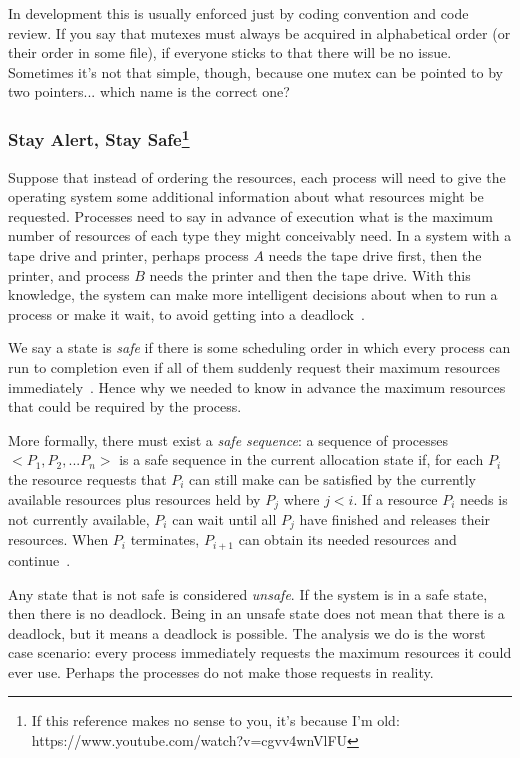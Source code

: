 In development this is usually enforced just by coding convention and code review. If you say that mutexes must always be acquired in alphabetical order (or their order in some file), if everyone sticks to that there will be no issue. Sometimes it's not that simple, though, because one mutex can be pointed to by two pointers... which name is the correct one?

\subsubsection*{Stay Alert, Stay Safe\footnote{If this reference makes no sense to you, it's because I'm old: https://www.youtube.com/watch?v=cgvv4wnVlFU}}

Suppose that instead of ordering the resources, each process will need to give the operating system some additional information about what resources might be requested. Processes need to say in advance of execution what is the maximum number of resources of each type they might conceivably need. In a system with a tape drive and printer, perhaps process $A$ needs the tape drive first, then the printer, and process $B$ needs the printer and then the tape drive. With this knowledge, the system can make more intelligent decisions about when to run a process or make it wait, to avoid getting into a deadlock~\cite{osc}.

We say a state is \textit{safe} if there is some scheduling order in which every process can run to completion even if all of them suddenly request their maximum resources immediately~\cite{mos}. Hence why we needed to know in advance the maximum resources that could be required by the process.

More formally, there must exist a \textit{safe sequence}: a sequence of processes $<P_{1}, P_{2}, ... P_{n}>$ is a safe sequence in the current allocation state if, for each $P_{i}$ the resource requests that $P_{i}$ can still make can be satisfied by the currently available resources plus resources held by $P_{j}$ where $j < i$. If a resource $P_{i}$ needs is not currently available, $P_{i}$ can wait until all $P_{j}$ have finished and releases their resources. When $P_{i}$ terminates, $P_{i+1}$ can obtain its needed resources and continue~\cite{osc}.

Any state that is not safe is considered \textit{unsafe}. If the system is in a safe state, then there is no deadlock. Being in an unsafe state does not mean that there is a deadlock, but it means a deadlock is possible. The analysis we do is the worst case scenario: every process immediately requests the maximum resources it could ever use. Perhaps the processes do not make those requests in reality.

